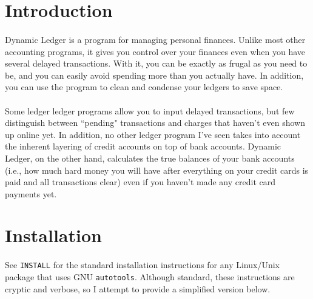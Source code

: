 \documentclass{article}
\begin{document}
\begin{flushleft}

\section{Introduction}

\paragraph{} Dynamic Ledger is a program for managing personal finances. Unlike most other accounting programs, it gives you control over your finances even when you have several delayed transactions. With it, you can be exactly as frugal as you need to be, and you can easily avoid spending more than you actually have. In addition, you can use the program to clean and condense your ledgers to save space.

\paragraph{} Some ledger ledger programs allow you to input delayed transactions, but few distinguish between ``pending" transactions and charges that haven't even shown up online yet. In addition, no other ledger program I've seen takes into account the inherent layering of credit accounts on top of bank accounts. Dynamic Ledger, on the other hand, calculates the true balances of your bank accounts (i.e., how much hard money you will have after everything on your credit cards is paid and all transactions clear) even if you haven't made any credit card payments yet.


\section{Installation}

\paragraph{} See {\tt INSTALL} for the standard installation instructions for any Linux/Unix package that uses GNU {\tt autotools}. Although standard, these instructions are cryptic and verbose, so I attempt to provide a simplified version below. 


\end{flushleft}
\end{document}
